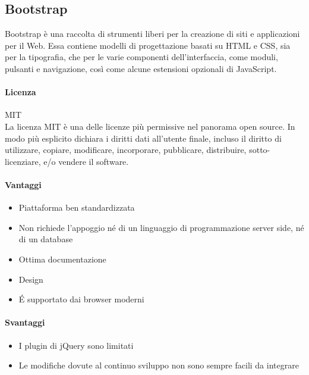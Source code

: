 \subsection{Bootstrap}

Bootstrap è una raccolta di strumenti liberi per la creazione di siti
e applicazioni per il Web. Essa contiene modelli di progettazione
basati su HTML e CSS, sia per la tipografia, che per le varie
componenti dell'interfaccia, come moduli, pulsanti e navigazione, così
come alcune estensioni opzionali di JavaScript. \\

\paragraph{Licenza} MIT \\
La licenza MIT è una delle licenze più permissive nel panorama open
source. In modo più esplicito dichiara i diritti dati all'utente
finale, incluso il diritto di utilizzare, copiare, modificare,
incorporare, pubblicare, distribuire, sotto-licenziare, e/o vendere il
software. 

\paragraph{Vantaggi}
\begin{itemize}
	
	\item Piattaforma ben standardizzata 
	\item Non richiede l’appoggio né di un linguaggio di programmazione server side, né di un database
	\item Ottima documentazione
	\item {} Design	
	\item \'E supportato dai browser moderni
	
\end{itemize}

\paragraph{Svantaggi} 
\begin{itemize}
	\item I plugin di jQuery sono limitati
	\item Le modifiche dovute al continuo sviluppo non sono sempre facili da integrare
\end{itemize}



